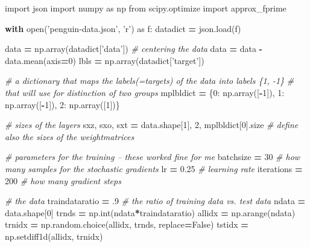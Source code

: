 \documentclass[]{book}
\newenvironment{Shaded}{\begin{snugshade}}{\end{snugshade}}
\newcommand{\BuiltInTok}[1]{#1}
\newcommand{\CommentTok}[1]{\textcolor[rgb]{0.56,0.35,0.01}{\textit{#1}}}
\newcommand{\ControlFlowTok}[1]{\textcolor[rgb]{0.13,0.29,0.53}{\textbf{#1}}}
\newcommand{\DecValTok}[1]{\textcolor[rgb]{0.00,0.00,0.81}{#1}}
\newcommand{\FloatTok}[1]{\textcolor[rgb]{0.00,0.00,0.81}{#1}}
\newcommand{\ImportTok}[1]{#1}
\newcommand{\NormalTok}[1]{#1}
\newcommand{\OperatorTok}[1]{\textcolor[rgb]{0.81,0.36,0.00}{\textbf{#1}}}
\newcommand{\StringTok}[1]{\textcolor[rgb]{0.31,0.60,0.02}{#1}}
\newcommand{\VariableTok}[1]{\textcolor[rgb]{0.00,0.00,0.00}{#1}}
\theoremstyle{definition}
\theoremstyle{definition}
\theoremstyle{definition}
\theoremstyle{definition}
\theoremstyle{remark}
\begin{document}
\begin{Shaded}
\begin{Highlighting}[]
\ImportTok{import}\NormalTok{ json}
\ImportTok{import}\NormalTok{ numpy }\ImportTok{as}\NormalTok{ np}
\ImportTok{from}\NormalTok{ scipy.optimize }\ImportTok{import}\NormalTok{ approx_fprime}

\ControlFlowTok{with} \BuiltInTok{open}\NormalTok{(}\StringTok{'penguin-data.json'}\NormalTok{, }\StringTok{'r'}\NormalTok{) }\ImportTok{as}\NormalTok{ f:}
\NormalTok{    datadict }\OperatorTok{=}\NormalTok{ json.load(f)}

\NormalTok{data }\OperatorTok{=}\NormalTok{ np.array(datadict[}\StringTok{'data'}\NormalTok{])}
\CommentTok{# centering the data}
\NormalTok{data }\OperatorTok{=}\NormalTok{ data }\OperatorTok{-}\NormalTok{ data.mean(axis}\OperatorTok{=}\DecValTok{0}\NormalTok{)}
\NormalTok{lbls }\OperatorTok{=}\NormalTok{ np.array(datadict[}\StringTok{'target'}\NormalTok{])}

\CommentTok{# a dictionary that maps the labels(=targets) of the data into labels \{1, -1\}}
\CommentTok{# that will use for distinction of two groups}
\NormalTok{mplbldict }\OperatorTok{=}\NormalTok{ \{}\DecValTok{0}\NormalTok{: np.array([}\OperatorTok{-}\DecValTok{1}\NormalTok{]),}
             \DecValTok{1}\NormalTok{: np.array([}\OperatorTok{-}\DecValTok{1}\NormalTok{]),}
             \DecValTok{2}\NormalTok{: np.array([}\DecValTok{1}\NormalTok{])\}}

\CommentTok{# sizes of the layers}
\NormalTok{sxz, sxo, sxt }\OperatorTok{=}\NormalTok{ data.shape[}\DecValTok{1}\NormalTok{], }\DecValTok{2}\NormalTok{, mplbldict[}\DecValTok{0}\NormalTok{].size}
\CommentTok{# define also the sizes of the weightmatrices}

\CommentTok{# parameters for the training -- these worked fine for me}
\NormalTok{batchsize }\OperatorTok{=} \DecValTok{30}  \CommentTok{# how many samples for the stochastic gradients}
\NormalTok{lr }\OperatorTok{=} \FloatTok{0.25}  \CommentTok{# learning rate}
\NormalTok{iterations }\OperatorTok{=} \DecValTok{200}  \CommentTok{# how many gradient steps}

\CommentTok{# the data}
\NormalTok{traindataratio }\OperatorTok{=} \FloatTok{.9}  \CommentTok{# the ratio of training data vs. test data}
\NormalTok{ndata }\OperatorTok{=}\NormalTok{ data.shape[}\DecValTok{0}\NormalTok{]}
\NormalTok{trnds }\OperatorTok{=}\NormalTok{ np.}\BuiltInTok{int}\NormalTok{(ndata}\OperatorTok{*}\NormalTok{traindataratio)}
\NormalTok{allidx }\OperatorTok{=}\NormalTok{ np.arange(ndata)}
\NormalTok{trnidx }\OperatorTok{=}\NormalTok{ np.random.choice(allidx, trnds, replace}\OperatorTok{=}\VariableTok{False}\NormalTok{)}
\NormalTok{tstidx }\OperatorTok{=}\NormalTok{ np.setdiff1d(allidx, trnidx)}
\end{Highlighting}
\end{Shaded}
\end{document}
